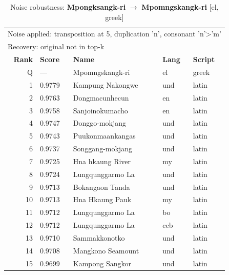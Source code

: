 \begin{table}[htbp]
\centering
\small
\caption{Noise robustness: \textbf{Mpongksangk-ri} $\rightarrow$ \textbf{Mpomngskangk-ri} [el, greek]}
\label{tab:noise-23}
\begin{tabular}{rllll}
\toprule
\multicolumn{5}{l}{\small Noise applied: transposition at 5, duplication 'n', consonant 'n'>'m'} \\
\multicolumn{5}{l}{\small Recovery: original not in top-k} \\
\midrule
\textbf{Rank} & \textbf{Score} & \textbf{Name} & \textbf{Lang} & \textbf{Script} \\
\midrule
\rowcolor{gray!20} Q & --- & Mpomngskangk-ri & el & greek \\
\midrule
1 & 0.9779 & Kampung Nakongwe & und & latin \\
2 & 0.9763 & Dongmacunhecun & en & latin \\
3 & 0.9758 & Sanjoinokumacho & en & latin \\
4 & 0.9747 & Donggo-mokjang & und & latin \\
5 & 0.9743 & Puukonmaankangas & und & latin \\
6 & 0.9737 & Songgang-mokjang & und & latin \\
7 & 0.9725 & Hna hkaung River & my & latin \\
8 & 0.9724 & Lungqunggarmo La & und & latin \\
9 & 0.9713 & Bokangaon Tanda & und & latin \\
10 & 0.9713 & Hna Hkaung Pauk & my & latin \\
11 & 0.9712 & Lungqunggarmo La & bo & latin \\
12 & 0.9712 & Lungqunggarmo La & ceb & latin \\
13 & 0.9710 & Sammakkonotko & und & latin \\
14 & 0.9708 & Mangkono Seamount & und & latin \\
15 & 0.9699 & Kampong Sangkor & und & latin \\
\bottomrule
\end{tabular}
\end{table}

